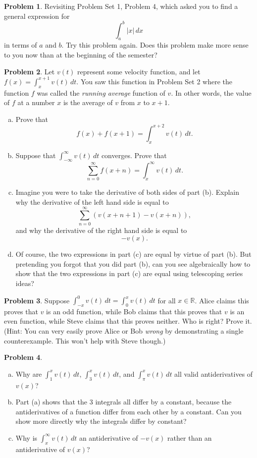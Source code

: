 \documentclass[11pt,oneside]{amsart}
\theoremstyle{definition}
\newtheorem{problem}{Problem}
\newcommand{\bR}{\mathbb{R}}
\begin{document}
\begin{problem}
Revisiting Problem Set 1, Problem 4, which asked you to find a general expression for
\[\int_a^b|x|\,dx\]
in terms of $a$ and $b$. Try this problem again. Does this problem make more sense to you now than at the beginning of the semester?
\end{problem}

\begin{problem}
Let $v(t)$ represent some velocity function, and let $\displaystyle f(x)=\int_x^{x+1}v(t)\,dt$. You saw this function in Problem Set 2 where the function $f$ was called the \emph{running average} function of $v$. In other words, the value of $f$ at a number $x$ is the average of $v$ from $x$ to $x+1$.
\begin{enumerate}[(a)]
  \item Prove that
        \[f(x)+f(x+1)=\int_x^{x+2} v(t)\,dt.\]
  \item Suppose that $\int_{-\infty}^\infty v(t)\,dt$ converges. Prove that
        \[\sum_{n=0}^\infty f(x+n)=\int_x^\infty v(t)\,dt.\]
  \item Imagine you were to take the derivative of both sides of part (b). Explain why the derivative of the left hand side is equal to
        \[\sum_{n=0}^\infty (v(x+n+1)-v(x+n)),\]
        and why the derivative of the right hand side is equal to
        \[-v(x).\]
  \item Of course, the two expressions in part (c) are equal by virtue of part (b). But pretending you forgot that you did part (b), can you see algebraically how to show that the two expressions in part (c) are equal using telescoping series ideas?
\end{enumerate}
\end{problem}

\begin{problem}
Suppose $\int_{-x}^0 v(t)\,dt=\int_0^x v(t)\,dt$ for all $x\in\bR$. Alice claims this proves that $v$ is an odd function, while Bob claims that this proves that $v$ is an even function, while Steve claims that this proves neither. Who is right? Prove it. (Hint: You can very easily prove Alice or Bob \emph{wrong} by demonstrating a single counterexample. This won't help with Steve though.)
\end{problem}

\begin{problem}
\leavevmode \begin{enumerate}[(a)]
  \item Why are $\int_1^x v(t)\,dt$, $\int_3^x v(t)\,dt$, and $\int_\pi^x v(t)\,dt$ all valid antiderivatives of $v(x)$?
  \item Part (a) shows that the 3 integrals all differ by a constant, because the antiderivatives of a function differ from each other by a constant. Can you show more directly why the integrals differ by constant?
  \item Why is $\int_x^\infty v(t)\,dt$ an antiderivative of $-v(x)$ rather than an antiderivative of $v(x)$?
\end{enumerate}
\end{problem}
\end{document}
